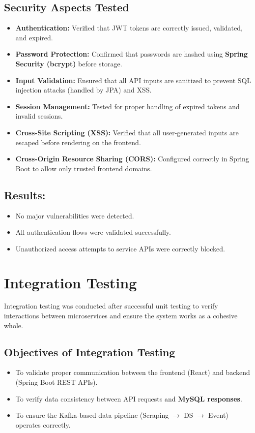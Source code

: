 \documentclass[12pt,a4paper]{report}
\begin{document}
\subsection*{Security Aspects Tested}
\begin{itemize}
    \item \textbf{Authentication:} Verified that JWT tokens are correctly issued, validated, and expired.
    \item \textbf{Password Protection:} Confirmed that passwords are hashed using \textbf{Spring Security (bcrypt)} before storage.
    \item \textbf{Input Validation:} Ensured that all API inputs are sanitized to prevent SQL injection attacks (handled by JPA) and XSS.
    \item \textbf{Session Management:} Tested for proper handling of expired tokens and invalid sessions.
    \item \textbf{Cross-Site Scripting (XSS):} Verified that all user-generated inputs are escaped before rendering on the frontend.
    \item \textbf{Cross-Origin Resource Sharing (CORS):} Configured correctly in Spring Boot to allow only trusted frontend domains.
\end{itemize}

\subsection*{Results:}
\begin{itemize}
    \item No major vulnerabilities were detected.
    \item All authentication flows were validated successfully.
    \item Unauthorized access attempts to service APIs were correctly blocked.
\end{itemize}

\section{Integration Testing}

Integration testing was conducted after successful unit testing to verify
interactions between microservices and ensure the system works as a cohesive whole.

\subsection*{Objectives of Integration Testing}
\begin{itemize}
    \item To validate proper communication between the frontend (React) and backend
          (Spring Boot REST APIs).
    \item To verify data consistency between API requests and \textbf{MySQL responses}.
    \item To ensure the Kafka-based data pipeline (Scraping $\rightarrow$ DS $\rightarrow$ Event) operates correctly.
\end{itemize}
\end{document}
